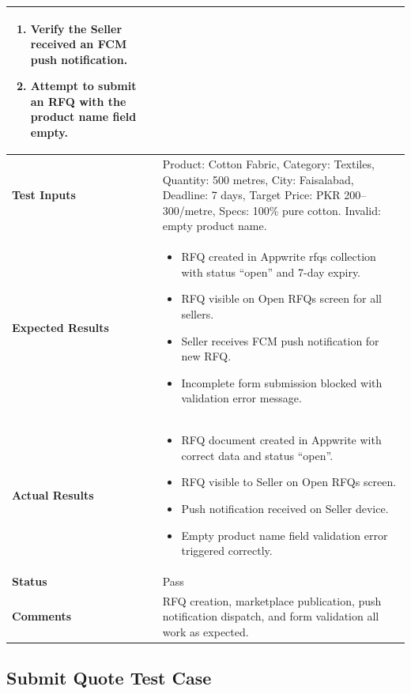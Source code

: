 \begin{table}[H]
\begin{tabular}{|p{3.2cm}|p{10.8cm}|}
\begin{enumerate}[leftmargin=*,noitemsep]
\item Verify the Seller received an FCM push notification.
\item Attempt to submit an RFQ with the product name field empty.
\end{enumerate} \\ \hline
\textbf{Test Inputs} & Product: Cotton Fabric, Category: Textiles, Quantity: 500 metres, City: Faisalabad, Deadline: 7 days, Target Price: PKR 200--300/metre, Specs: 100\% pure cotton. \newline Invalid: empty product name. \\ \hline
\textbf{Expected Results} &
\begin{itemize}[leftmargin=*,noitemsep]
\item RFQ created in Appwrite rfqs collection with status ``open'' and 7-day expiry.
\item RFQ visible on Open RFQs screen for all sellers.
\item Seller receives FCM push notification for new RFQ.
\item Incomplete form submission blocked with validation error message.
\end{itemize} \\ \hline
\textbf{Actual Results} &
\begin{itemize}[leftmargin=*,noitemsep]
\item RFQ document created in Appwrite with correct data and status ``open''.
\item RFQ visible to Seller on Open RFQs screen.
\item Push notification received on Seller device.
\item Empty product name field validation error triggered correctly.
\end{itemize} \\ \hline
\textbf{Status} & Pass \\ \hline
\textbf{Comments} & RFQ creation, marketplace publication, push notification dispatch, and form validation all work as expected. \\ \hline
\end{tabular}
\end{table}

\subsection{Submit Quote Test Case}

